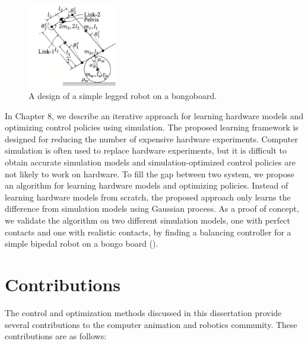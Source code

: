\begin{figure}
 \vspace{-10pt}
  \begin{center}
    \includegraphics[width=0.35\textwidth]{images/intro_simple_robot.png}
  \end{center}
   \vspace{-25pt}
  \caption{A design of a simple legged robot on a bongoboard.}
  \label{fig:intro_bongo}
   \vspace{-10pt}
\end{figure}
In Chapter 8, we describe an iterative approach for learning 
hardware models and optimizing control policies using simulation.
The proposed learning framework is designed for reducing the number of
expensive hardware experiments. 
Computer simulation is often used to replace hardware experiments,
but it is difficult to obtain accurate simulation models and
simulation-optimized control policies are not likely to work on hardware.
To fill the gap between two system, we propose an algorithm for learning
hardware models and optimizing policies. 
Instead of learning hardware models from scratch, the proposed approach only
learns the difference from simulation models using Gaussian process.
As a proof of concept, we validate the algorithm on two different 
simulation models, one with perfect contacts and one with realistic contacts,
by finding a balancing controller for a simple bipedal robot on a bongo board
().

\section{Contributions}
The control and optimization methods discussed in this dissertation provide
several contributions to the computer animation and robotics community. 
These contributions are as follows:

